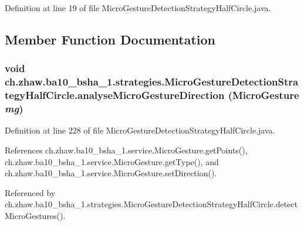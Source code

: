 Definition at line 19 of file MicroGestureDetectionStrategyHalfCircle.java.

\subsection{Member Function Documentation}
\hypertarget{classch_1_1zhaw_1_1ba10__bsha__1_1_1strategies_1_1MicroGestureDetectionStrategyHalfCircle_a472dbb75d876bcc2e87a98a0b1afb14c}{
\subsubsection[{analyseMicroGestureDirection}]{\setlength{\rightskip}{0pt plus 5cm}void ch.zhaw.ba10\_\-bsha\_\-1.strategies.MicroGestureDetectionStrategyHalfCircle.analyseMicroGestureDirection ({\bf MicroGesture} {\em mg})}}
\label{classch_1_1zhaw_1_1ba10__bsha__1_1_1strategies_1_1MicroGestureDetectionStrategyHalfCircle_a472dbb75d876bcc2e87a98a0b1afb14c}


Definition at line 228 of file MicroGestureDetectionStrategyHalfCircle.java.

References ch.zhaw.ba10\_\-bsha\_\-1.service.MicroGesture.getPoints(), ch.zhaw.ba10\_\-bsha\_\-1.service.MicroGesture.getType(), and ch.zhaw.ba10\_\-bsha\_\-1.service.MicroGesture.setDirection().

Referenced by ch.zhaw.ba10\_\-bsha\_\-1.strategies.MicroGestureDetectionStrategyHalfCircle.detectMicroGestures().

